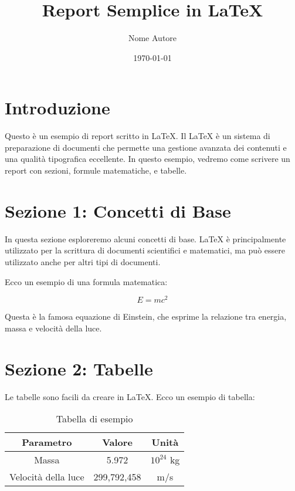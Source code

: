 \documentclass[12pt]{article} %
\title{Report Semplice in LaTeX}
\author{Nome Autore}
\date{\today}
\begin{document}
\maketitle  %

\tableofcontents  %
\newpage  %

\section{Introduzione}
Questo è un esempio di report scritto in LaTeX. Il LaTeX è un sistema di preparazione di documenti che permette una gestione avanzata dei contenuti e una qualità tipografica eccellente. In questo esempio, vedremo come scrivere un report con sezioni, formule matematiche, e tabelle.

\section{Sezione 1: Concetti di Base}
In questa sezione esploreremo alcuni concetti di base. LaTeX è principalmente utilizzato per la scrittura di documenti scientifici e matematici, ma può essere utilizzato anche per altri tipi di documenti.

Ecco un esempio di una formula matematica:

\begin{equation}
E = mc^2
\end{equation}

Questa è la famosa equazione di Einstein, che esprime la relazione tra energia, massa e velocità della luce.

\section{Sezione 2: Tabelle}
Le tabelle sono facili da creare in LaTeX. Ecco un esempio di tabella:

\begin{table}[h]
\centering
\begin{tabular}{|c|c|c|}
\hline
\textbf{Parametro} & \textbf{Valore} & \textbf{Unità} \\
\hline
Massa & 5.972 & $10^{24}$ kg \\
Velocità della luce & 299,792,458 & m/s \\
\hline
\end{tabular}
\caption{Tabella di esempio}
\end{table}
\end{document}
